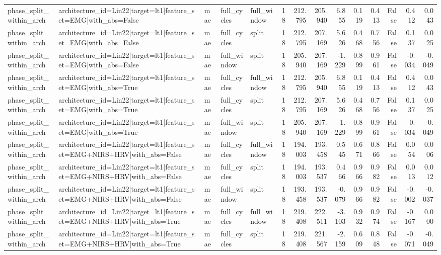 \begin{table}
\begin{tabular}{lllllrrrrrrrrr}
phase_split_within_arch & architecture_id=Lin22|target=lt1|feature_set=EMG|with_abs=False & mae & full_cycles & full_window & 18 & 212.795 & 205.940 & 6.855 & 0.119 & 0.413 & False & 0.412 & 0.043 \\
phase_split_within_arch & architecture_id=Lin22|target=lt1|feature_set=EMG|with_abs=False & mae & full_cycles & split & 18 & 212.795 & 207.169 & 5.626 & 0.468 & 0.756 & False & 0.137 & 0.025 \\
phase_split_within_arch & architecture_id=Lin22|target=lt1|feature_set=EMG|with_abs=False & mae & full_window & split & 18 & 205.940 & 207.169 & -1.229 & 0.899 & 0.961 & False & -0.034 & -0.049 \\
phase_split_within_arch & architecture_id=Lin22|target=lt1|feature_set=EMG|with_abs=True & mae & full_cycles & full_window & 18 & 212.795 & 205.940 & 6.855 & 0.119 & 0.413 & False & 0.412 & 0.043 \\
phase_split_within_arch & architecture_id=Lin22|target=lt1|feature_set=EMG|with_abs=True & mae & full_cycles & split & 18 & 212.795 & 207.169 & 5.626 & 0.468 & 0.756 & False & 0.137 & 0.025 \\
phase_split_within_arch & architecture_id=Lin22|target=lt1|feature_set=EMG|with_abs=True & mae & full_window & split & 18 & 205.940 & 207.169 & -1.229 & 0.899 & 0.961 & False & -0.034 & -0.049 \\
phase_split_within_arch & architecture_id=Lin22|target=lt1|feature_set=EMG+NIRS+HRV|with_abs=False & mae & full_cycles & full_window & 18 & 194.003 & 193.458 & 0.545 & 0.671 & 0.866 & False & 0.054 & 0.006 \\
phase_split_within_arch & architecture_id=Lin22|target=lt1|feature_set=EMG+NIRS+HRV|with_abs=False & mae & full_cycles & split & 18 & 194.003 & 193.537 & 0.466 & 0.966 & 0.982 & False & 0.013 & 0.012 \\
phase_split_within_arch & architecture_id=Lin22|target=lt1|feature_set=EMG+NIRS+HRV|with_abs=False & mae & full_window & split & 18 & 193.458 & 193.537 & -0.079 & 0.966 & 0.982 & False & -0.002 & -0.037 \\
phase_split_within_arch & architecture_id=Lin22|target=lt1|feature_set=EMG+NIRS+HRV|with_abs=True & mae & full_cycles & full_window & 18 & 219.408 & 222.511 & -3.103 & 0.932 & 0.974 & False & -0.167 & 0.000 \\
phase_split_within_arch & architecture_id=Lin22|target=lt1|feature_set=EMG+NIRS+HRV|with_abs=True & mae & full_cycles & split & 18 & 219.408 & 221.567 & -2.159 & 0.609 & 0.848 & False & -0.071 & -0.049 \\

\end{tabular}
\end{table}
